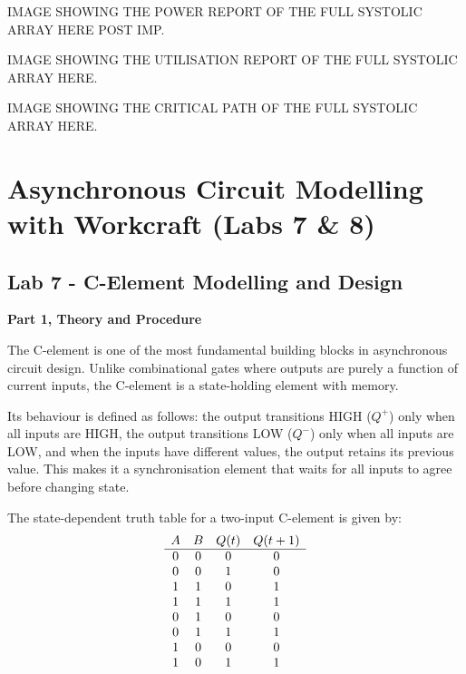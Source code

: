 \documentclass[a4paper,12pt]{article}
\begin{document}
\begin{large}
    IMAGE SHOWING THE POWER REPORT OF THE FULL SYSTOLIC ARRAY HERE POST IMP.
\end{large}

\begin{large}
    IMAGE SHOWING THE UTILISATION REPORT OF THE FULL SYSTOLIC ARRAY HERE.
\end{large}

\begin{large}
    IMAGE SHOWING THE CRITICAL PATH OF THE FULL SYSTOLIC ARRAY HERE.
\end{large}

\section{Asynchronous Circuit Modelling with Workcraft \- (Labs 7 \& 8)}

\subsection{Lab 7 - C-Element Modelling and Design}

\textbf{Part 1, Theory and Procedure}

The C-element is one of the most fundamental building blocks in asynchronous circuit design. Unlike combinational gates where outputs are purely a function of current inputs, the C-element is a state-holding element with memory. 

Its behaviour is defined as follows: the output transitions HIGH ($Q^+$) only when all inputs are HIGH, the output transitions LOW ($Q^-$) only when all inputs are LOW, and when the inputs have different values, the output retains its previous value. This makes it a synchronisation element that waits for all inputs to agree before changing state.

The state-dependent truth table for a two-input C-element is given by:
\[
\begin{array}{c c c c}
A & B & Q(t) & Q(t+1) \\
\hline
0 & 0 & 0 & 0 \\
0 & 0 & 1 & 0 \\
1 & 1 & 0 & 1 \\
1 & 1 & 1 & 1 \\
0 & 1 & 0 & 0 \\
0 & 1 & 1 & 1 \\
1 & 0 & 0 & 0 \\
1 & 0 & 1 & 1
\end{array}
\]
\end{document}
